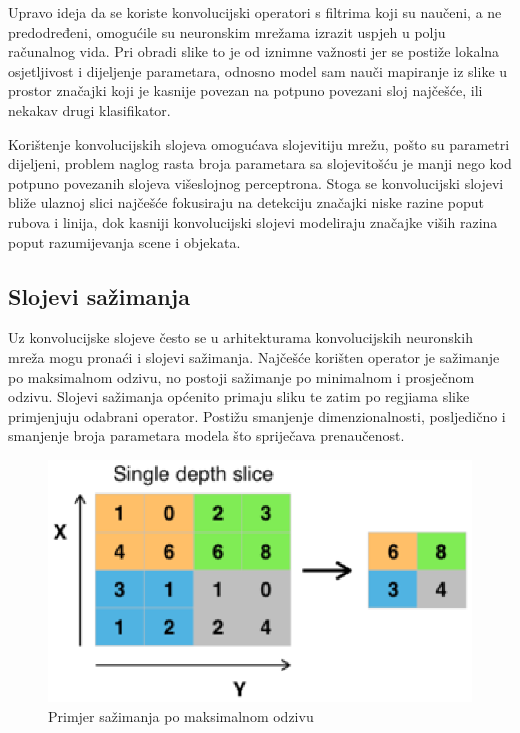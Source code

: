 \documentclass[times, utf8, diplomski]{fer}
\begin{document}
Upravo ideja da se koriste konvolucijski operatori s filtrima koji su naučeni, a ne predodređeni, omogućile su neuronskim mrežama izrazit uspjeh u polju računalnog vida. Pri obradi slike to je od iznimne važnosti jer se postiže lokalna osjetljivost i dijeljenje parametara, odnosno model sam nauči mapiranje iz slike u prostor značajki koji je kasnije povezan na potpuno povezani sloj najčešće, ili nekakav drugi klasifikator. \par

Korištenje konvolucijskih slojeva omogućava slojevitiju mrežu, pošto su parametri dijeljeni, problem naglog rasta broja parametara sa slojevitošću je manji nego kod potpuno povezanih slojeva višeslojnog perceptrona. Stoga se konvolucijski slojevi bliže ulaznoj slici najčešće fokusiraju na detekciju značajki niske razine poput rubova i linija, dok kasniji konvolucijski slojevi modeliraju značajke viših razina poput razumijevanja scene i objekata.

\subsection{Slojevi sažimanja}
Uz konvolucijske slojeve često se u arhitekturama konvolucijskih neuronskih mreža mogu pronaći i slojevi sažimanja. Najčešće korišten operator je sažimanje po maksimalnom odzivu, no postoji sažimanje po minimalnom i prosječnom odzivu. Slojevi sažimanja općenito primaju sliku te zatim po regjiama slike primjenjuju odabrani operator. Postižu smanjenje dimenzionalnosti, posljedično i smanjenje broja parametara modela što spriječava prenaučenost.

\begin{figure}[htbp]
    \centering
    \includegraphics[scale=1]{Slike/Max_pooling}
    \caption{Primjer sažimanja po maksimalnom odzivu \cite{maxpoolexample}}
\end{figure}
\end{document}

